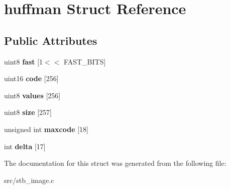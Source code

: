 \hypertarget{structhuffman}{}\section{huffman Struct Reference}
\label{structhuffman}
\subsection*{Public Attributes}
\begin{DoxyCompactItemize}
\item 
\hypertarget{structhuffman_a9dbb29a8ed724a32f502d9595510ddc2}{}uint8 {\bfseries fast} \mbox{[}1$<$$<$ F\+A\+S\+T\+\_\+\+B\+I\+T\+S\mbox{]}\label{structhuffman_a9dbb29a8ed724a32f502d9595510ddc2}

\item 
\hypertarget{structhuffman_a9925018a95d5a2122cd732561fa0fa64}{}uint16 {\bfseries code} \mbox{[}256\mbox{]}\label{structhuffman_a9925018a95d5a2122cd732561fa0fa64}

\item 
\hypertarget{structhuffman_a313d78cf23f40b314c25681ff2a6224b}{}uint8 {\bfseries values} \mbox{[}256\mbox{]}\label{structhuffman_a313d78cf23f40b314c25681ff2a6224b}

\item 
\hypertarget{structhuffman_afdb0fbcf25aec42ba30b0d0e2453a057}{}uint8 {\bfseries size} \mbox{[}257\mbox{]}\label{structhuffman_afdb0fbcf25aec42ba30b0d0e2453a057}

\item 
\hypertarget{structhuffman_aeb78aca6c7377faaad8123566d54fc98}{}unsigned int {\bfseries maxcode} \mbox{[}18\mbox{]}\label{structhuffman_aeb78aca6c7377faaad8123566d54fc98}

\item 
\hypertarget{structhuffman_a04255e3e1c6de74d36a08a1aa4e9537d}{}int {\bfseries delta} \mbox{[}17\mbox{]}\label{structhuffman_a04255e3e1c6de74d36a08a1aa4e9537d}

\end{DoxyCompactItemize}


The documentation for this struct was generated from the following file\+:\begin{DoxyCompactItemize}
\item 
src/stb\+\_\+image.\+c\end{DoxyCompactItemize}
